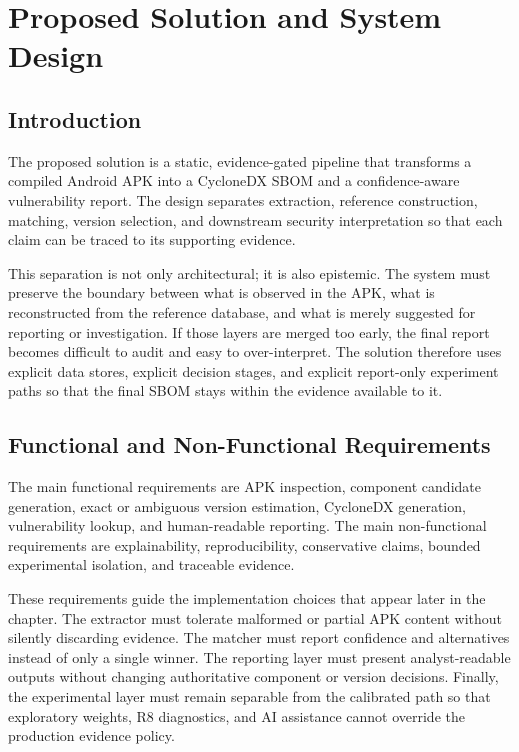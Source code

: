 \chapter{Proposed Solution and System Design}
\label{ch:pfe-design}

\section{Introduction}

The proposed solution is a static, evidence-gated pipeline that transforms a
compiled Android APK into a CycloneDX SBOM and a confidence-aware
vulnerability report. The design separates extraction, reference construction,
matching, version selection, and downstream security interpretation so that
each claim can be traced to its supporting evidence.

This separation is not only architectural; it is also epistemic. The system
must preserve the boundary between what is observed in the APK, what is
reconstructed from the reference database, and what is merely suggested for
reporting or investigation. If those layers are merged too early, the final
report becomes difficult to audit and easy to over-interpret. The solution
therefore uses explicit data stores, explicit decision stages, and explicit
report-only experiment paths so that the final SBOM stays within the evidence
available to it.

\section{Functional and Non-Functional Requirements}

The main functional requirements are APK inspection, component candidate
generation, exact or ambiguous version estimation, CycloneDX generation,
vulnerability lookup, and human-readable reporting. The main non-functional
requirements are explainability, reproducibility, conservative claims,
bounded experimental isolation, and traceable evidence.

These requirements guide the implementation choices that appear later in the
chapter. The extractor must tolerate malformed or partial APK content without
silently discarding evidence. The matcher must report confidence and
alternatives instead of only a single winner. The reporting layer must
present analyst-readable outputs without changing authoritative component or
version decisions. Finally, the experimental layer must remain separable from
the calibrated path so that exploratory weights, R8 diagnostics, and AI
assistance cannot override the production evidence policy.

